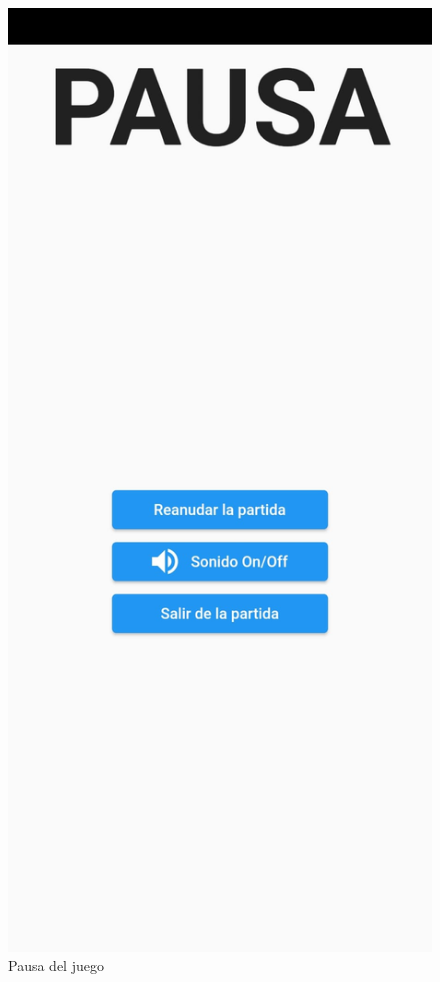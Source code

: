 \documentclass{article}
\begin{document}
\begin{figure}[H]
\center
        \includegraphics[scale=0.3]{imagenes/captura6.jpeg}
        \caption{Pausa del juego}
\end{figure}
\end{document}
